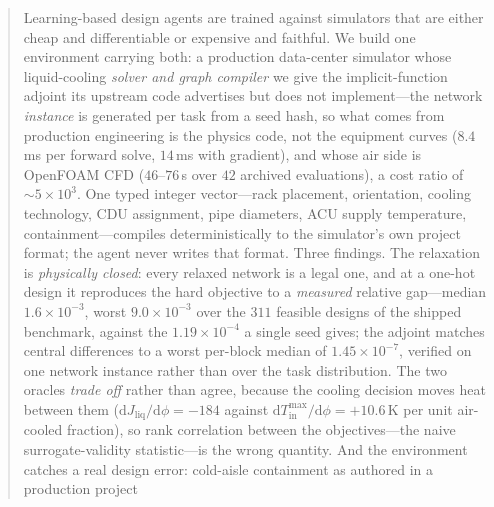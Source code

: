 \documentclass{article}
\newcommand{\Jliq}{J_{\mathrm{liq}}}
\begin{document}
\printAffiliationsAndNotice{}

\begin{abstract}
Learning-based design agents are trained against simulators that are either cheap
and differentiable or expensive and faithful.  We build one environment carrying
both: a production data-center simulator whose liquid-cooling \emph{solver and graph
compiler} we give the implicit-function adjoint its upstream code advertises but does
not implement---the network \emph{instance} is generated per task from a seed hash, so
what comes from production engineering is the physics code, not the equipment curves
($8.4$\,ms per forward solve, $14$\,ms with gradient), and whose air side is
OpenFOAM CFD ($46$--$76$\,s over $42$ archived evaluations), a cost ratio of ${\sim}5\times10^3$.  One typed integer vector---rack
placement, orientation, cooling technology, CDU assignment, pipe diameters, ACU
supply temperature, containment---compiles deterministically to the simulator's own
project format; the agent never writes that format.  Three findings.  The relaxation
is \emph{physically closed}: every relaxed network is a legal one, and at a one-hot
design it reproduces the hard objective to a \emph{measured} relative gap---median
$1.6\times10^{-3}$, worst $9.0\times10^{-3}$ over the $311$ feasible designs of the
shipped benchmark, against the $1.19\times10^{-4}$ a single seed gives; the adjoint matches central
differences to a worst per-block median of
$1.45\times10^{-7}$, verified on one network instance rather than over the task
distribution.  The two oracles \emph{trade off}
rather than agree, because the cooling decision moves heat between them
($\mathrm{d}\Jliq/\mathrm{d}\phi = -184$ against
$\mathrm{d}T^{\max}_{\mathrm{in}}/\mathrm{d}\phi = +10.6$\,K per unit air-cooled
fraction), so rank correlation between the objectives---the naive
surrogate-validity statistic---is the wrong quantity.  And the environment catches a
real design error: cold-aisle containment as authored in a production project

\end{abstract}
\end{document}

